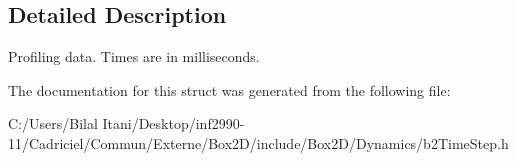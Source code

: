 \subsection{Detailed Description}
Profiling data. Times are in milliseconds. 

The documentation for this struct was generated from the following file\+:\begin{DoxyCompactItemize}
\item 
C\+:/\+Users/\+Bilal Itani/\+Desktop/inf2990-\/11/\+Cadriciel/\+Commun/\+Externe/\+Box2\+D/include/\+Box2\+D/\+Dynamics/b2\+Time\+Step.\+h\end{DoxyCompactItemize}
